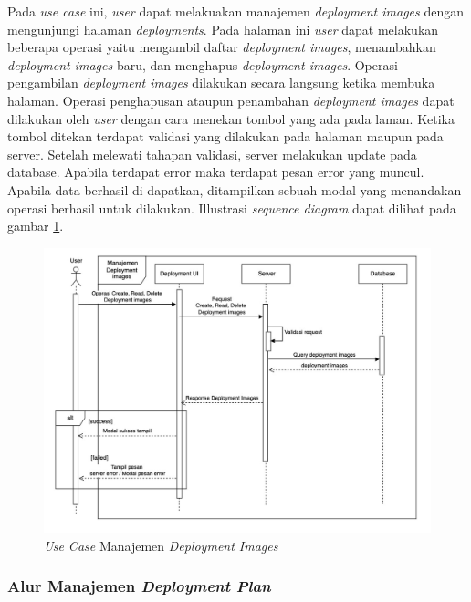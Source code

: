 Pada \textit{use case} ini, \textit{user} dapat melakuakan manajemen \textit{deployment images} dengan mengunjungi halaman \textit{deployments}. Pada halaman ini \textit{user} dapat melakukan beberapa operasi yaitu mengambil daftar \textit{deployment images}, menambahkan \textit{deployment images} baru, dan menghapus \textit{deployment images}. Operasi pengambilan \textit{deployment images} dilakukan secara langsung ketika membuka halaman. Operasi penghapusan ataupun penambahan \textit{deployment images} dapat dilakukan oleh \textit{user} dengan cara menekan tombol yang ada pada laman. Ketika tombol ditekan terdapat validasi yang dilakukan pada halaman maupun pada server. Setelah melewati tahapan validasi, server melakukan update pada database. Apabila terdapat error maka terdapat pesan error yang muncul. Apabila data berhasil di dapatkan, ditampilkan sebuah modal yang menandakan operasi berhasil untuk dilakukan. Illustrasi \textit{sequence diagram} dapat dilihat pada gambar \ref{fig:usecase-10}.

\begin{figure}[ht]
  \centering
  \includegraphics[width=1\textwidth]{resources/chapter-3/usecase/uc-10.jpg}
  \caption{\textit{Use Case} Manajemen \textit{Deployment Images}}
  \label{fig:usecase-10}
\end{figure}

\pagebreak

\subsubsection{Alur Manajemen \textit{Deployment Plan}}

